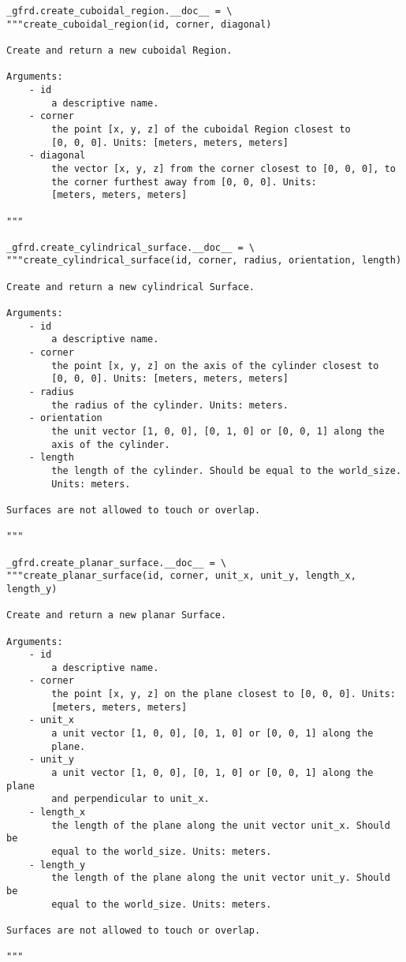 \documentclass[a4paper,10pt]{article}
\begin{document}
\begin{verbatim}
_gfrd.create_cuboidal_region.__doc__ = \
"""create_cuboidal_region(id, corner, diagonal)

Create and return a new cuboidal Region.

Arguments:
    - id
        a descriptive name.
    - corner
        the point [x, y, z] of the cuboidal Region closest to
        [0, 0, 0]. Units: [meters, meters, meters]
    - diagonal
        the vector [x, y, z] from the corner closest to [0, 0, 0], to 
        the corner furthest away from [0, 0, 0]. Units:
        [meters, meters, meters]

"""

_gfrd.create_cylindrical_surface.__doc__ = \
"""create_cylindrical_surface(id, corner, radius, orientation, length)

Create and return a new cylindrical Surface.

Arguments:
    - id
        a descriptive name.
    - corner
        the point [x, y, z] on the axis of the cylinder closest to 
        [0, 0, 0]. Units: [meters, meters, meters]
    - radius
        the radius of the cylinder. Units: meters.
    - orientation
        the unit vector [1, 0, 0], [0, 1, 0] or [0, 0, 1] along the 
        axis of the cylinder.
    - length
        the length of the cylinder. Should be equal to the world_size. 
        Units: meters.

Surfaces are not allowed to touch or overlap.

"""

_gfrd.create_planar_surface.__doc__ = \
"""create_planar_surface(id, corner, unit_x, unit_y, length_x, length_y)

Create and return a new planar Surface.

Arguments:
    - id
        a descriptive name.
    - corner
        the point [x, y, z] on the plane closest to [0, 0, 0]. Units: 
        [meters, meters, meters]
    - unit_x
        a unit vector [1, 0, 0], [0, 1, 0] or [0, 0, 1] along the 
        plane.
    - unit_y
        a unit vector [1, 0, 0], [0, 1, 0] or [0, 0, 1] along the plane 
        and perpendicular to unit_x.
    - length_x
        the length of the plane along the unit vector unit_x. Should be 
        equal to the world_size. Units: meters.
    - length_y
        the length of the plane along the unit vector unit_y. Should be 
        equal to the world_size. Units: meters.

Surfaces are not allowed to touch or overlap.

"""
\end{verbatim} 
\end{document}
